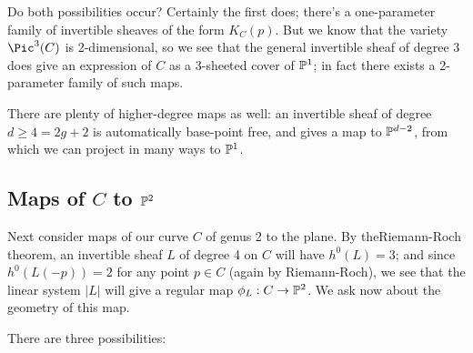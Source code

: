 Do both possibilities occur? Certainly the first does; there's a one-parameter family of invertible sheaves of the form $K_C(p)$. But we know that the variety $\Pic^3(C)$ is 2-dimensional, so we see that the general invertible sheaf of degree 3 does  give an expression of $C$ as a 3-sheeted cover of $\PP^1$; in fact there exists a 2-parameter family of such maps.

There are plenty of higher-degree maps as well: an invertible sheaf of degree $d \geq 4 = 2g+2$ is automatically base-point free, and gives a map to $\PP^{d-2}$, from which we can project in many ways
to $\PP^1$.

\subsection{Maps of $C$ to $\PP^2$} Next consider maps of our curve $C$ of genus 2 to the plane. By theRiemann-Roch theorem, an invertible sheaf $L$ of degree 4 on $C$ will have $h^0(L) = 3$; and since $h^0(L(-p)) = 2$ for any point $p \in C$ (again by Riemann-Roch), we see that the linear system $|L|$ will give a regular map $\phi_L : C \to \PP^2$. We ask now about the geometry of this map.

There are three possibilities:

